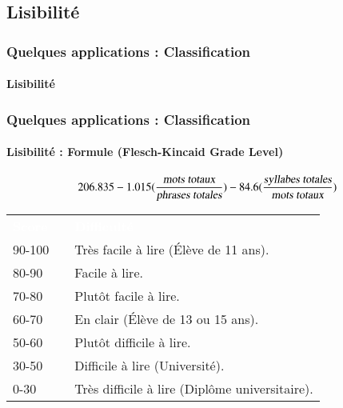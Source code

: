 \documentclass[xcolor=table]{beamer}
\begin{document}
\subsection{Lisibilité}

\begin{frame}
	\frametitle{Quelques applications : Classification}
	\framesubtitle{Lisibilité}
\end{frame}

\begin{frame}
	\frametitle{Quelques applications : Classification}
	\framesubtitle{Lisibilité : Formule (Flesch-Kincaid Grade Level)}
	\[
	206.835 - 1.015 (\frac{\text{\slshape mots totaux}}{\text{\slshape phrases totales}})
	- 84.6 (\frac{\text{\slshape syllabes totales}}{\text{\slshape mots totaux}})
	\]
	
	\begin{center}
			\footnotesize
		\begin{tabular}{p{}lp{}}
			\rowcolor{darkblue}
			\bfseries\textcolor{white}{Score} && \bfseries\textcolor{white}{Difficulté}\\
			90-100 && Très facile à lire (Élève de 11 ans). \\
			80-90 && Facile à lire. \\
			70-80 && Plutôt facile à lire.\\
			60-70 && En clair (Élève de 13 ou 15 ans). \\
			50-60 && Plutôt difficile à lire. \\
			30-50 && Difficile à lire (Université). \\
			0-30 && Très difficile à lire (Diplôme universitaire). \\
		\end{tabular}
	\end{center}
	
\end{frame}
\end{document}
